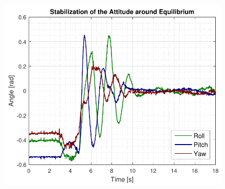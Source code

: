 \begin{figure}[H]
	\includegraphics[scale=.8]{figures/attitudeAccept.pdf}
	\centering			
	\label{fig:attitudeAccept}
\end{figure} 


